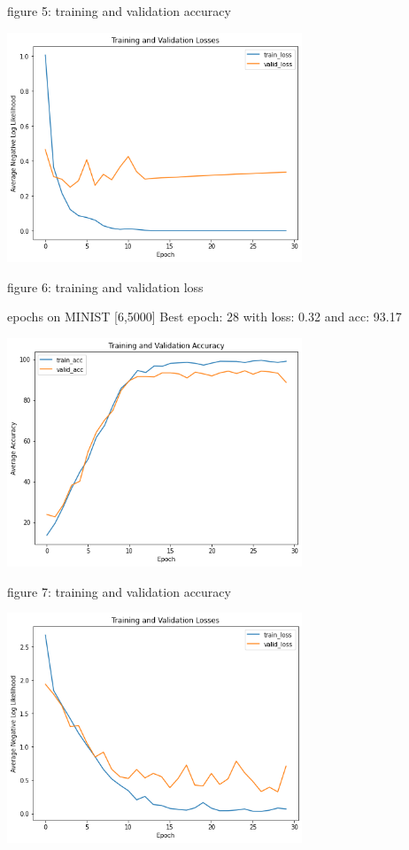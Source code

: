 \documentclass{homework}
\begin{document}
{figure 5: training and validation accuracy}

\centering
\includegraphics[width=250pt]{lossp3_512.png}

{figure 6: training and validation loss}

\raggedright

 epochs on MINIST [6,5000] \newline
Best epoch: 28 with loss: 0.32 and acc: 93.17 \newline

\centering
\includegraphics[width=250pt]{accuracyp3_5000.png}

{figure 7: training and validation accuracy}

\centering
\includegraphics[width=250pt]{lossp3_5000.png}
\end{document}
